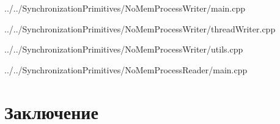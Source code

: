 \documentclass[a4paper, 12pt]{article}		%
\begin{document}

{../../SynchronizationPrimitives/NoMemProcessWriter/main.cpp}


{../../SynchronizationPrimitives/NoMemProcessWriter/threadWriter.cpp}


{../../SynchronizationPrimitives/NoMemProcessWriter/utils.cpp}


{../../SynchronizationPrimitives/NoMemProcessReader/main.cpp}

\newpage
\section*{Заключение}
\end{document}
